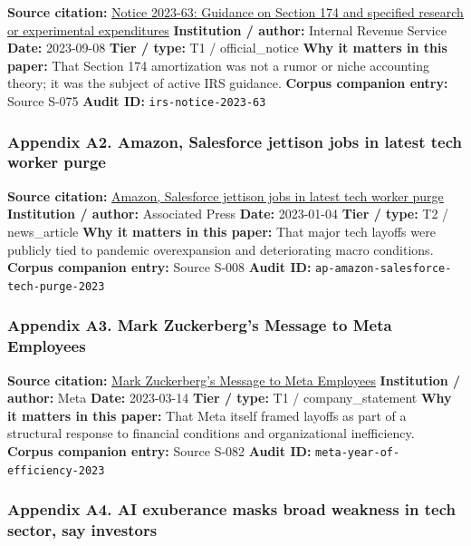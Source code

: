 \documentclass[
  american,
  11pt,
  letterpaper,
]{article}
\begin{document}
\textbf{Source citation:}
\href{https://www.irs.gov/pub/irs-drop/n-23-63.pdf}{Notice 2023-63:
Guidance on Section 174 and specified research or experimental
expenditures} \textbf{Institution / author:} Internal Revenue Service
\textbf{Date:} 2023-09-08 \textbf{Tier / type:} T1 / official\_notice
\textbf{Why it matters in this paper:} That Section 174 amortization was
not a rumor or niche accounting theory; it was the subject of active IRS
guidance. \textbf{Corpus companion entry:} Source S-075 \textbf{Audit
ID:} \texttt{irs-notice-2023-63}

\subsubsection{Appendix A2. Amazon, Salesforce jettison jobs in latest
tech worker
purge}\label{appendix-a2-amazon-salesforce-jettison-jobs-in-latest-tech-worker-purge}

\textbf{Source citation:}
\href{https://apnews.com/article/bbb2f3a09eafdfc7cda54a3b87e538ad}{Amazon,
Salesforce jettison jobs in latest tech worker purge}
\textbf{Institution / author:} Associated Press \textbf{Date:}
2023-01-04 \textbf{Tier / type:} T2 / news\_article \textbf{Why it
matters in this paper:} That major tech layoffs were publicly tied to
pandemic overexpansion and deteriorating macro conditions.
\textbf{Corpus companion entry:} Source S-008 \textbf{Audit ID:}
\texttt{ap-amazon-salesforce-tech-purge-2023}

\subsubsection{Appendix A3. Mark Zuckerberg's Message to Meta
Employees}\label{appendix-a3-mark-zuckerberg-s-message-to-meta-employees}

\textbf{Source citation:}
\href{https://about.fb.com/news/2023/03/mark-zuckerberg-meta-year-of-efficiency/}{Mark
Zuckerberg's Message to Meta Employees} \textbf{Institution / author:}
Meta \textbf{Date:} 2023-03-14 \textbf{Tier / type:} T1 /
company\_statement \textbf{Why it matters in this paper:} That Meta
itself framed layoffs as part of a structural response to financial
conditions and organizational inefficiency. \textbf{Corpus companion
entry:} Source S-082 \textbf{Audit ID:}
\texttt{meta-year-of-efficiency-2023}

\subsubsection{Appendix A4. AI exuberance masks broad weakness in tech
sector, say
investors}\label{appendix-a4-ai-exuberance-masks-broad-weakness-in-tech-sector-say-investors}
\end{document}
